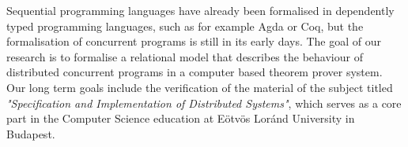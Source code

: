 Sequential programming languages have already been formalised in dependently typed programming languages, such as for example Agda or Coq, but the formalisation of concurrent programs is still in its early days. The goal of our research is to formalise a relational model that describes the behaviour of distributed concurrent programs in a computer based theorem prover system. Our long term goals include the verification of the material of the subject titled \textit{"Specification and Implementation of Distributed Systems"}, which serves as a core part in the Computer Science education at Eötvös Loránd University in Budapest.